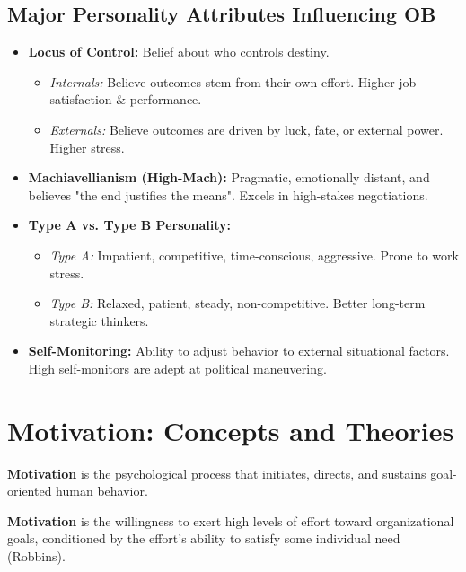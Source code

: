 \documentclass[11pt,a4paper]{article}
\begin{document}
\subsection{Major Personality Attributes Influencing OB}
\begin{itemize}[leftmargin=*, itemsep=4pt]
  \item \textbf{Locus of Control:} Belief about who controls destiny.
    \begin{itemize}[leftmargin=*, noitemsep]
      \item \textit{Internals:} Believe outcomes stem from their own effort. Higher job satisfaction \& performance.
      \item \textit{Externals:} Believe outcomes are driven by luck, fate, or external power. Higher stress.
    \end{itemize}
  \item \textbf{Machiavellianism (High-Mach):} Pragmatic, emotionally distant, and believes "the end justifies the means". Excels in high-stakes negotiations.
  \item \textbf{Type A vs. Type B Personality:}
    \begin{itemize}[leftmargin=*, noitemsep]
      \item \textit{Type A:} Impatient, competitive, time-conscious, aggressive. Prone to work stress.
      \item \textit{Type B:} Relaxed, patient, steady, non-competitive. Better long-term strategic thinkers.
    \end{itemize}
  \item \textbf{Self-Monitoring:} Ability to adjust behavior to external situational factors. High self-monitors are adept at political maneuvering.
\end{itemize}

\section{Motivation: Concepts and Theories}

\textbf{Motivation} is the psychological process that initiates, directs, and sustains goal-oriented human behavior.

\begin{tcolorbox}[defbox, title={Definition of Motivation}]
  \textbf{Motivation} is the willingness to exert high levels of effort toward organizational goals, conditioned by the effort's ability to satisfy some individual need (Robbins).
\end{tcolorbox}
\end{document}
